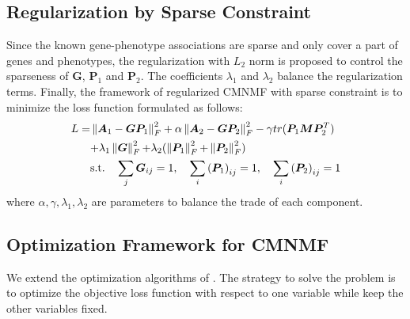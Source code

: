 \documentclass{bmcart}
\begin{document}
\subsection*{\textbf{Regularization by Sparse Constraint}}
Since the known gene-phenotype associations are sparse and only cover a part of genes and phenotypes, the regularization with $L_2$ norm is proposed to control the sparseness of $\bm{G}$, $\bm{P}_1$ and $\bm{P}_2$. The coefficients ${\lambda_1}$ and $\lambda_2$ balance the regularization terms. Finally, the framework of regularized CMNMF with sparse constraint is to minimize the loss function formulated as follows:
\begin{equation}\label{equ:R-CMNMF}
\begin{split}
L=
&\left\| {{\bm{A}_1} - \bm{G}{\bm{P}_1}} \right\|_F^2 + \alpha \left\| {{\bm{A}_2} - \bm{G}{\bm{P}_2}} \right\|_F^2 - \gamma tr({\bm{P}_1}\bm{MP}_2^T)\\
&{\rm{ + }}{\lambda _1}\left\| \bm{G} \right\|_F^2{\rm{ + }}{\lambda _2}(\left\| {{\bm{P}_1}} \right\|_F^2{\rm{ + }}\left\| {{\bm{P}_2}} \right\|_F^2)\\
&\mathrm{s.t. }\quad \sum_j\bm{G}_{ij}=1,\quad \sum_i{(\bm{P}_1)}_{ij}=1,\quad \sum_i{(\bm{P}_2)}_{ij}=1
\end{split}
\end{equation}
where $\alpha ,\gamma ,{\lambda _1},{\lambda _2}$ are parameters to balance the trade of each component.

\subsection*{\textbf{Optimization Framework for CMNMF}}
We extend the optimization algorithms of \cite{Singh2008}. The strategy to solve the problem is to optimize the objective loss function with respect to one variable while keep the other variables fixed.
\end{document}
